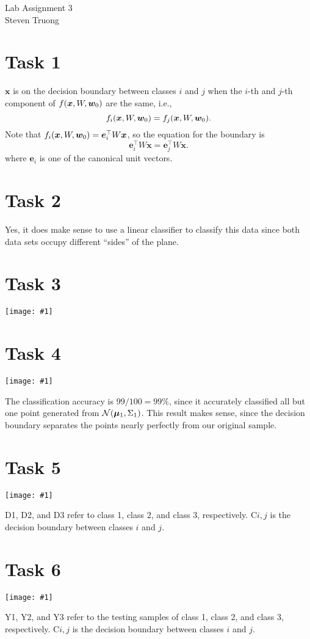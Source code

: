 \documentclass{article}
\newcommand{\T}{\top}
\newcommand{\image}[2]{\begin{center}\texttt{[image: \#1]}\end{center}}
\renewcommand{\vec}[1]{\boldsymbol{#1}}
\DeclarePairedDelimiter{\p}{(}{)}
\begin{document}
{\huge Lab Assignment 3} \\	
\large Steven Truong \\

\normalsize

\section*{Task 1}
$\vec{x}$ is on the decision boundary between classes $i$ and $j$ when the $i$-th and $j$-th component of $f\p{\vec{x}, W, \vec{w}_0}$ are the same, i.e.,
\[
	f_i\p{\vec{x}, W, \vec{w}_0} = f_j\p{\vec{x}, W, \vec{w}_0}.
\]
Note that $f_i\p{\vec{x}, W, \vec{w}_0} = \vec{e}_i^\T W\vec{x}$, so the equation for the boundary is
\[
	\vec{e}_i^\T W\vec{x} = \vec{e}_j^\T W\vec{x}.
\]
where $\vec{e}_i$ is one of the canonical unit vectors.

\section*{Task 2}
Yes, it does make sense to use a linear classifier to classify this data since both data sets occupy different ``sides'' of the plane.

\section*{Task 3}
\image{images/training-data.png}{0.7}

\section*{Task 4}
\image{images/testing-data.png}{0.7}
The classification accuracy is $99/100 = 99\%$, since it accurately classified all but one point generated from $\mathcal{N}\p{\vec{\mu}_1, \Sigma_1}$. This result makes sense, since the decision boundary separates the points nearly perfectly from our original sample.

\section*{Task 5}
\image{images/3-classes-training-data.png}{0.7}
D1, D2, and D3 refer to class 1, class 2, and class 3, respectively. C$i,j$ is the decision boundary between classes $i$ and $j$.

\section*{Task 6}
\image{images/3-classes-testing-data.png}{0.7}
Y1, Y2, and Y3 refer to the testing samples of class 1, class 2, and class 3, respectively. C$i,j$ is the decision boundary between classes $i$ and $j$.
\end{document}
